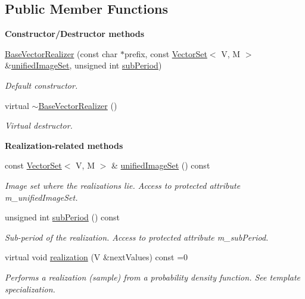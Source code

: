 \subsection*{Public Member Functions}
\begin{Indent}{\bf Constructor/\-Destructor methods}\par
\begin{DoxyCompactItemize}
\item 
\hyperlink{class_q_u_e_s_o_1_1_base_vector_realizer_ad77258f8737d87b5d0cd58b398939c70}{Base\-Vector\-Realizer} (const char $\ast$prefix, const \hyperlink{class_q_u_e_s_o_1_1_vector_set}{Vector\-Set}$<$ V, M $>$ \&\hyperlink{class_q_u_e_s_o_1_1_base_vector_realizer_ad958991bab8d6369e8a0d66b22a237d4}{unified\-Image\-Set}, unsigned int \hyperlink{class_q_u_e_s_o_1_1_base_vector_realizer_ad9fda59efacf5bd84c472c96dfa00613}{sub\-Period})
\begin{DoxyCompactList}\small\item\em Default constructor. \end{DoxyCompactList}\item 
virtual \hyperlink{class_q_u_e_s_o_1_1_base_vector_realizer_abc2eda9b3cea09c559c19e349c537b91}{$\sim$\-Base\-Vector\-Realizer} ()
\begin{DoxyCompactList}\small\item\em Virtual destructor. \end{DoxyCompactList}\end{DoxyCompactItemize}
\end{Indent}
\begin{Indent}{\bf Realization-\/related methods}\par
\begin{DoxyCompactItemize}
\item 
const \hyperlink{class_q_u_e_s_o_1_1_vector_set}{Vector\-Set}$<$ V, M $>$ \& \hyperlink{class_q_u_e_s_o_1_1_base_vector_realizer_ad958991bab8d6369e8a0d66b22a237d4}{unified\-Image\-Set} () const 
\begin{DoxyCompactList}\small\item\em Image set where the realizations lie. Access to protected attribute m\-\_\-unified\-Image\-Set. \end{DoxyCompactList}\item 
unsigned int \hyperlink{class_q_u_e_s_o_1_1_base_vector_realizer_ad9fda59efacf5bd84c472c96dfa00613}{sub\-Period} () const 
\begin{DoxyCompactList}\small\item\em Sub-\/period of the realization. Access to protected attribute m\-\_\-sub\-Period. \end{DoxyCompactList}\item 
virtual void \hyperlink{class_q_u_e_s_o_1_1_base_vector_realizer_a6845173dd79a80ae11c86cde26e55817}{realization} (V \&next\-Values) const =0
\begin{DoxyCompactList}\small\item\em Performs a realization (sample) from a probability density function. See template specialization. \end{DoxyCompactList}\end{DoxyCompactItemize}
\end{Indent}
